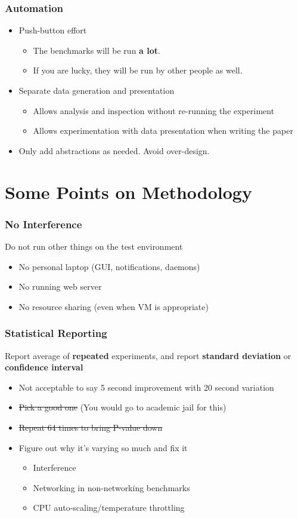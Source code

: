 \documentclass[xcolor={dvipsnames},aspectratio=149]{beamer}
\begin{document}
\begin{frame}
  \frametitle{Automation}
  \begin{itemize}
  \item Push-button effort
    \begin{itemize}
    \item The benchmarks will be run \textbf{a lot}.
    \item If you are lucky, they will be run by other people as well.
    \end{itemize}
  \item Separate data generation and presentation
    \begin{itemize}
    \item Allows analysis and inspection without re-running the experiment
    \item Allows experimentation with data presentation when writing the paper
    \end{itemize}
  \item Only add abstractions as needed. Avoid over-design.
  \end{itemize}
\end{frame}

\section{Some Points on Methodology}
\begin{frame}
  \frametitle{No Interference}
  Do not run other things on the test environment
  \begin{itemize}
  \item No personal laptop (GUI, notifications, daemons)
  \item No running web server
  \item No resource sharing (even when VM is appropriate)
  \end{itemize}
\end{frame}

\begin{frame}
  \frametitle{Statistical Reporting}
  Report average of \textbf{repeated} experiments, and report \textbf{standard deviation} or
  \textbf{confidence interval}
  \begin{itemize}
  \item Not acceptable to say 5 second improvement with 20 second variation
  \item \sout{Pick a good one} (You would go to academic jail for this)
  \item \sout{Repeat 64 times to bring P-value down}
  \item Figure out why it's varying so much and fix it
    \begin{itemize}
    \item Interference
    \item Networking in non-networking benchmarks
    \item CPU auto-scaling/temperature throttling
    \end{itemize}
  \end{itemize}
\end{frame}
\end{document}
